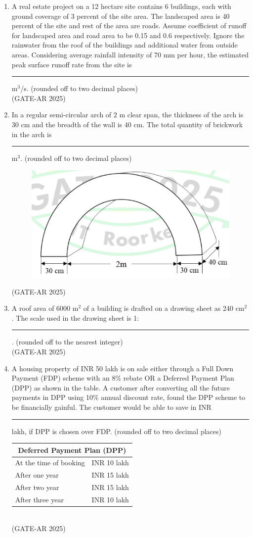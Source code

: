 \documentclass[a4paper,10pt]{article}
\begin{document}
\begin{enumerate}
    \item A real estate project on a 12 hectare site contains 6 buildings, each with ground coverage of 3 percent of the site area. The landscaped area is 40 percent of the site and rest of the area are roads. Assume coefficient of runoff for landscaped area and road area to be 0.15 and 0.6 respectively. Ignore the rainwater from the roof of the buildings and additional water from outside areas. Considering average rainfall intensity of 70 mm per hour, the estimated peak surface runoff rate from the site is \rule{2cm}{0.4pt} m$^3$/s. (rounded off to two decimal places) \\
    \hfill (GATE-AR 2025)
    
    \item In a regular semi-circular arch of 2 m clear span, the thickness of the arch is 30 cm and the breadth of the wall is 40 cm. The total quantity of brickwork in the arch is \rule{2cm}{0.4pt} m$^3$. (rounded off to two decimal places) \\
    \begin{figure}[h!]
    \centering
    \includegraphics[width=0.5\columnwidth]{figs/07.jpg}
    \caption{}
    \label{fig:Img07}
    \end{figure}
    \hfill (GATE-AR 2025)

    \item A roof area of 6000 m$^2$ of a building is drafted on a drawing sheet as 240 cm$^2$. The scale used in the drawing sheet is 1:\rule{2cm}{0.4pt}. (rounded off to the nearest integer) \\
\hfill (GATE-AR 2025)

\item A housing property of INR 50 lakh is on sale either through a Full Down Payment (FDP) scheme with an 8\% rebate OR a Deferred Payment Plan (DPP) as shown in the table. A customer after converting all the future payments in DPP using 10\% annual discount rate, found the DPP scheme to be financially gainful. The customer would be able to save in INR \rule{2cm}{0.4pt} lakh, if DPP is chosen over FDP. (rounded off to two decimal places) \\
\begin{tabular}{ | l | l | }
\hline
\multicolumn{2}{|c|}{Deferred Payment Plan (DPP)} \\
\hline
At the time of booking & INR 10 lakh \\
\hline
After one year & INR 15 lakh \\
\hline
After two year & INR 15 lakh \\
\hline
After three year & INR 10 lakh \\
\hline
\end{tabular} \\
\hfill (GATE-AR 2025)


\end{enumerate}
\end{document}
